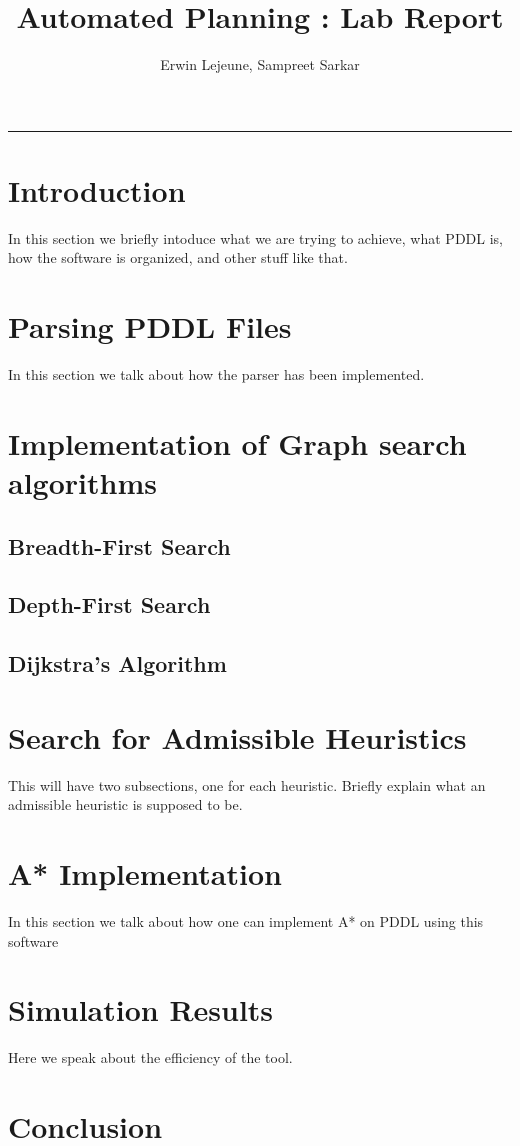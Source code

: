 



\title{Automated Planning : Lab Report}
\author{Erwin Lejeune, Sampreet Sarkar}
\date{}


\nocite{*}
\maketitle
\hrule
\section{Introduction}
In this section we briefly intoduce what we are trying to achieve, what PDDL is, how the software is organized, and other stuff like that.
\section{Parsing PDDL Files}\label{sec:parsing-pddl}
In this section we talk about how the parser has been implemented.

\section{Implementation of Graph search algorithms}

\subsection{Breadth-First Search}

\subsection{Depth-First Search}

\subsection{Dijkstra's Algorithm}

\section{Search for Admissible Heuristics}\label{sec:heuristic}
This will have two subsections, one for each heuristic. Briefly explain what an admissible heuristic is supposed to be.

\section{A* Implementation}\label{sec:a-star}
In this section we talk about how one can implement A* on PDDL using this software

\section{Simulation Results}\label{sec:sim-results}
Here we speak about the efficiency of the tool.

\section{Conclusion}



